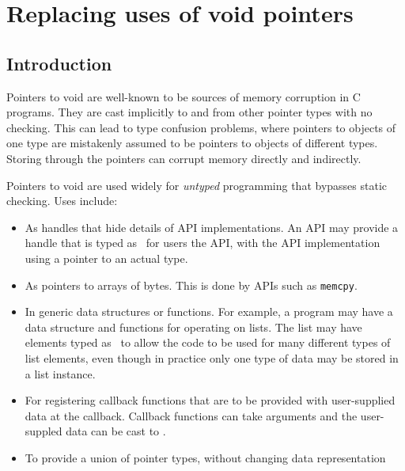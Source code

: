
\chapter{Replacing uses of void pointers}

\section{Introduction}

Pointers to void are well-known to be sources of memory corruption in C
programs. They are cast implicitly to and from other pointer types with no checking.
This can lead to type confusion problems, where pointers to objects of one type are mistakenly
assumed to be pointers to objects of different types.  Storing through the pointers
can corrupt memory directly and indirectly.

Pointers to void are used widely for {\em untyped} programming that bypasses
static checking.  Uses include:
\begin{itemize}
\item As handles that hide details of API implementations.  An
API may provide a handle that is typed as \uncheckedptrvoid\ for 
users the API, with the API implementation using a pointer to an actual
type.
\item As pointers to arrays of bytes.  This is done by APIs such as \lstinline+memcpy+.
\item In generic data structures or functions. For example, 
a program may have a data structure and functions for operating on lists. 
The list may  have elements typed as \uncheckedptrvoid\ to allow the code
to be used for many different types of list elements, 
even though in practice only one type of data may be stored in a list instance. 
\item For registering callback functions that are to be provided with 
user-supplied data at the callback.  Callback functions can take \uncheckedptrvoid{} arguments and 
the user-suppled data can be cast to \uncheckedptrvoid{}.
\item To provide a union of pointer types, without changing data representation
\end{itemize}

